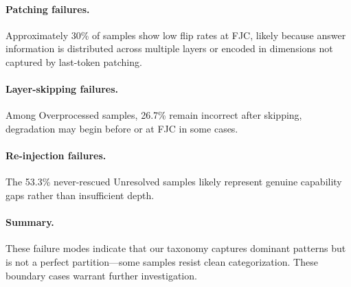 \paragraph{Patching failures.}
Approximately 30\% of samples show low flip rates at FJC, likely because answer information is distributed across multiple layers or encoded in dimensions not captured by last-token patching.

\paragraph{Layer-skipping failures.}
Among Overprocessed samples, 26.7\% remain incorrect after skipping, degradation may begin before or at FJC in some cases.

\paragraph{Re-injection failures.}
The 53.3\% never-rescued Unresolved samples likely represent genuine capability gaps rather than insufficient depth.

\paragraph{Summary.}
These failure modes indicate that our taxonomy captures dominant patterns but is not a perfect partition---some samples resist clean categorization. These boundary cases warrant further investigation.
